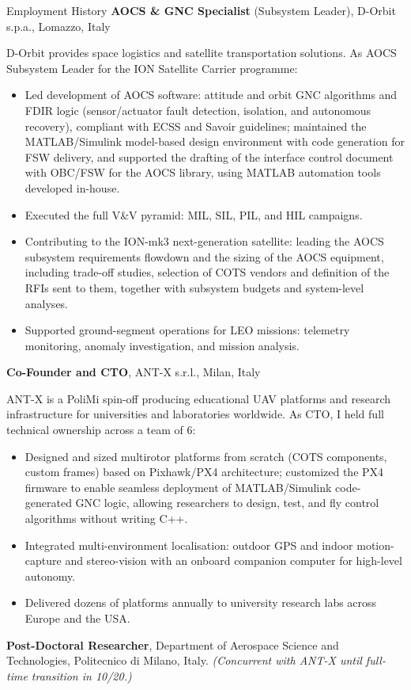 \begin{rubric}{Employment History}
\entry*[06/24 -- Present]
	\textbf{AOCS \& GNC Specialist} (Subsystem Leader), D-Orbit s.p.a., Lomazzo, Italy

    D-Orbit provides space logistics and satellite transportation solutions. As AOCS Subsystem Leader for the ION Satellite Carrier programme:
    \begin{itemize}
        \item Led development of AOCS software: attitude and orbit GNC algorithms and FDIR logic (sensor/actuator fault detection, isolation, and autonomous recovery), compliant with ECSS and Savoir guidelines; maintained the MATLAB/Simulink model-based design environment with code generation for FSW delivery, and supported the drafting of the interface control document with OBC/FSW for the AOCS library, using MATLAB automation tools developed in-house.
        \item Executed the full V\&V pyramid: MIL, SIL, PIL, and HIL campaigns.
        \item Contributing to the ION-mk3 next-generation satellite: leading the AOCS subsystem requirements flowdown and the sizing of the AOCS equipment, including trade-off studies, selection of COTS vendors and definition of the RFIs sent to them, together with subsystem budgets and system-level analyses.
        \item Supported ground-segment operations for LEO missions: telemetry monitoring, anomaly investigation, and mission analysis.
    \end{itemize}
%
\entry*[02/20 -- 06/24]
	\textbf{Co-Founder and CTO}, ANT-X s.r.l., Milan, Italy

    ANT-X is a PoliMi spin-off producing educational UAV platforms and research infrastructure for universities and laboratories worldwide. As CTO, I held full technical ownership across a team of 6:
    \begin{itemize}
        \item Designed and sized multirotor platforms from scratch (COTS components, custom frames) based on Pixhawk/PX4 architecture; customized the PX4 firmware to enable seamless deployment of MATLAB/Simulink code-generated GNC logic, allowing researchers to design, test, and fly control algorithms without writing C++.
        \item Integrated multi-environment localisation: outdoor GPS and indoor motion-capture and stereo-vision with an onboard companion computer for high-level autonomy.
        \item Delivered dozens of platforms annually to university research labs across Europe and the USA.
    \end{itemize}
%
\entry*[02/20 -- 10/20]
	\textbf{Post-Doctoral Researcher}, Department of Aerospace Science and Technologies, Politecnico di Milano, Italy. \textit{(Concurrent with ANT-X until full-time transition in 10/20.)}


\end{rubric}
